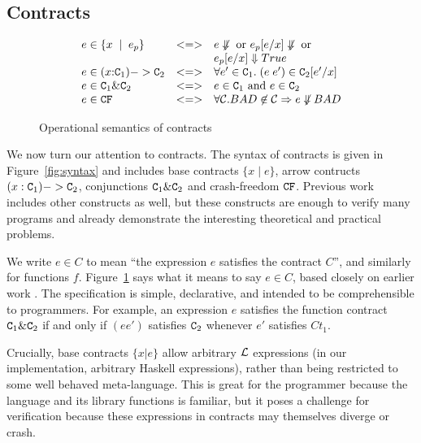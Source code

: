 \subsection{Contracts}


\begin{figure}
\[\begin{array}{lcl}
e \in \{ x\;\mid\;e_p\} & <=> &  e \not\Downarrow \mbox{ or } e_p[e/x] \not\Downarrow \mbox{ or} \\ 
                        &     &  e_p[e/x] \Downarrow True \\
e \in (x{:}{\tt C}_1) -> {\tt C}_2 & <=> & 
                        \forall e' \in {\tt C}_1.\; (e\;e') \in {\tt C}_2[e'/x] \\
e \in {\tt C}_1 \& {\tt C}_2 & <=> & e \in {\tt C}_1 \mbox{ and } e \in {\tt C}_2 \\
e \in {\tt CF}            & <=> & \forall {\cal C}. BAD \not\in {\cal C} \Rightarrow e \not\Downarrow BAD
\end{array} 
\]
\caption{Operational semantics of contracts} \label{f:contract-spec-op}
\end{figure}

We now turn our attention to contracts. The syntax of contracts
is given in Figure~\ref{fig:syntax} and includes base contracts
$\{ x \mid e \}$, arrow contructs $(x : {\tt C}_1) -> {\tt C}_2$, conjunctions
${\tt C}_1 \& {\tt C}_2$ and crash-freedom ${\tt CF}$. Previous work~\cite{xu+:contracts} 
includes other constructs as well, but these constructs are enough to verify 
many programs and already demonstrate the interesting theoretical and practical problems.

We write $e \in C$ to mean ``the expression $e$ satisfies the contract $C$'', and similarly
for functions $f$.
Figure~\ref{f:contract-spec-op} says what it means to say $e \in C$,
based closely on earlier work \cite{xu}.  The specification is
simple, declarative, and intended to be comprehensible to programmers.
For example, an expression $e$ satisfies the function contract ${\tt C}_1 \& {\tt C}_2$ if and 
only if $(e e')$ satisfies ${\tt C}_2$ whenever $e'$ satisfies $Ct_1$.

Crucially, base contracts $\{x|e\}$ allow arbitrary $\cal L$
expressions (in our implementation, arbitrary Haskell expressions),
rather than being restricted to some well behaved meta-language.  This
is great for the programmer because the language and its library
functions is familiar, but it poses a challenge for verification
because these expressions in contracts may themselves diverge or
crash.


